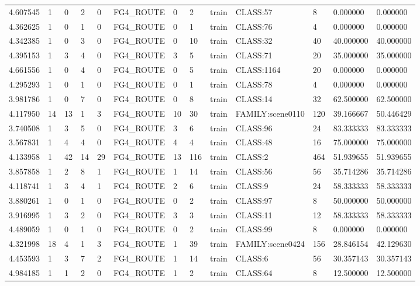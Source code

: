 \begin{tabular}{lllllllllllll}
4.607545 & 1 & 0 & 2 & 0 & FG4\_ROUTE & 0 & 2 & train & CLASS:57 & 8 & 0.000000 & 0.000000 \\
4.362625 & 1 & 0 & 1 & 0 & FG4\_ROUTE & 0 & 1 & train & CLASS:76 & 4 & 0.000000 & 0.000000 \\
4.342385 & 1 & 0 & 3 & 0 & FG4\_ROUTE & 0 & 10 & train & CLASS:32 & 40 & 40.000000 & 40.000000 \\
4.395153 & 1 & 3 & 4 & 0 & FG4\_ROUTE & 3 & 5 & train & CLASS:71 & 20 & 35.000000 & 35.000000 \\
4.661556 & 1 & 0 & 4 & 0 & FG4\_ROUTE & 0 & 5 & train & CLASS:1164 & 20 & 0.000000 & 0.000000 \\
4.295293 & 1 & 0 & 1 & 0 & FG4\_ROUTE & 0 & 1 & train & CLASS:78 & 4 & 0.000000 & 0.000000 \\
3.981786 & 1 & 0 & 7 & 0 & FG4\_ROUTE & 0 & 8 & train & CLASS:14 & 32 & 62.500000 & 62.500000 \\
4.117950 & 14 & 13 & 1 & 3 & FG4\_ROUTE & 10 & 30 & train & FAMILY:scene0110 & 120 & 39.166667 & 50.446429 \\
3.740508 & 1 & 3 & 5 & 0 & FG4\_ROUTE & 3 & 6 & train & CLASS:96 & 24 & 83.333333 & 83.333333 \\
3.567831 & 1 & 4 & 4 & 0 & FG4\_ROUTE & 4 & 4 & train & CLASS:48 & 16 & 75.000000 & 75.000000 \\
4.133958 & 1 & 42 & 14 & 29 & FG4\_ROUTE & 13 & 116 & train & CLASS:2 & 464 & 51.939655 & 51.939655 \\
3.857858 & 1 & 2 & 8 & 1 & FG4\_ROUTE & 1 & 14 & train & CLASS:56 & 56 & 35.714286 & 35.714286 \\
4.118741 & 1 & 3 & 4 & 1 & FG4\_ROUTE & 2 & 6 & train & CLASS:9 & 24 & 58.333333 & 58.333333 \\
3.880261 & 1 & 0 & 1 & 0 & FG4\_ROUTE & 0 & 2 & train & CLASS:97 & 8 & 50.000000 & 50.000000 \\
3.916995 & 1 & 3 & 2 & 0 & FG4\_ROUTE & 3 & 3 & train & CLASS:11 & 12 & 58.333333 & 58.333333 \\
4.489059 & 1 & 0 & 1 & 0 & FG4\_ROUTE & 0 & 2 & train & CLASS:99 & 8 & 0.000000 & 0.000000 \\
4.321998 & 18 & 4 & 1 & 3 & FG4\_ROUTE & 1 & 39 & train & FAMILY:scene0424 & 156 & 28.846154 & 42.129630 \\
4.453593 & 1 & 3 & 7 & 2 & FG4\_ROUTE & 1 & 14 & train & CLASS:6 & 56 & 30.357143 & 30.357143 \\
4.984185 & 1 & 1 & 2 & 0 & FG4\_ROUTE & 1 & 2 & train & CLASS:64 & 8 & 12.500000 & 12.500000 \\

\end{tabular}
